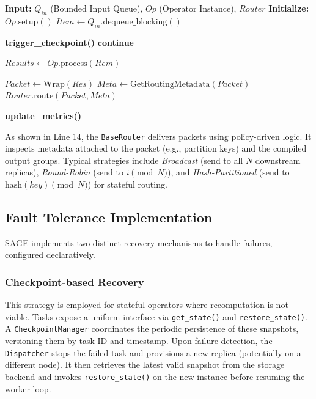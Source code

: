 \begin{algorithm}[h]
\caption{SAGE Task Worker Loop}
\label{alg:worker_loop}
\begin{algorithmic}[1]
\STATE \textbf{Input:} $Q_{in}$ (Bounded Input Queue), $Op$ (Operator Instance), $Router$
\STATE \textbf{Initialize:} $Op.\text{setup}()$
    \STATE {}
    \STATE $Item \leftarrow Q_{in}.\text{dequeue\_blocking}()$

        \STATE \textbf{trigger\_checkpoint()}
        \STATE \textbf{continue}
    \ENDIF

    \STATE $Results \leftarrow Op.\text{process}(Item)$

        \STATE $Packet \leftarrow \text{Wrap}(Res)$
        \STATE $Meta \leftarrow \text{GetRoutingMetadata}(Packet)$
        \STATE {}
        \STATE $Router.\text{route}(Packet, Meta)$
    \ENDFOR

    \STATE \textbf{update\_metrics()}
\ENDWHILE
\end{algorithmic}
\end{algorithm}

As shown in Line 14, the \texttt{BaseRouter} delivers packets using policy-driven logic. It inspects metadata attached to the packet (e.g., partition keys) and the compiled output groups. Typical strategies include \emph{Broadcast} (send to all $N$ downstream replicas), \emph{Round-Robin} (send to $i \pmod N$), and \emph{Hash-Partitioned} (send to $\text{hash}(key) \pmod N$) for stateful routing.

\subsection{Fault Tolerance Implementation}
\label{subsec:app_ft}
SAGE implements two distinct recovery mechanisms to handle failures, configured declaratively.

\subsubsection{Checkpoint-based Recovery}
This strategy is employed for stateful operators where recomputation is not viable. Tasks expose a uniform interface via \texttt{get\_state()} and \texttt{restore\_state()}. A \texttt{CheckpointManager} coordinates the periodic persistence of these snapshots, versioning them by task ID and timestamp. Upon failure detection, the \texttt{Dispatcher} stops the failed task and provisions a new replica (potentially on a different node). It then retrieves the latest valid snapshot from the storage backend and invokes \texttt{restore\_state()} on the new instance before resuming the worker loop.

